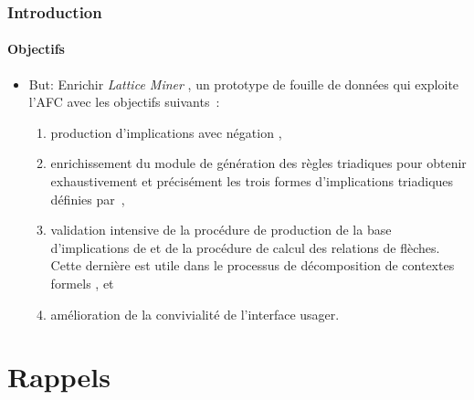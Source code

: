 \documentclass[french]{beamer}
\begin{document}
\begin{frame}
\frametitle{Introduction}
\framesubtitle{Objectifs}
\begin{itemize}
\item But: Enrichir \emph{Lattice Miner} \parencite{Roberge2007}, un prototype de fouille de données qui exploite l’AFC avec les objectifs suivants~:

\begin{enumerate}
\item production d’implications avec négation \parencite{Missaoui2012},
\item enrichissement du module de génération des règles triadiques pour obtenir exhaustivement et précisément les trois formes d’implications triadiques définies par~\parencite{Ganter2004},
\item validation intensive de la procédure de production de la base d’implications de \parencite{Guigues1986} et de la procédure de calcul des relations de flèches. Cette dernière est utile dans le processus de décomposition de contextes formels \parencite{Viaud2015}, et
\item amélioration de la convivialité de l'interface usager.
\end{enumerate}
\end{itemize}
\end{frame}

\section{Rappels}
\end{document}
